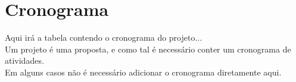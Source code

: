 \section{Cronograma}
\label{sec::cronograma}
Aqui irá a tabela contendo o cronograma do projeto...\\
Um projeto é uma proposta, e como tal é necessário conter um cronograma de atividades.\\
Em alguns casos não é necessário adicionar o cronograma diretamente aqui.
